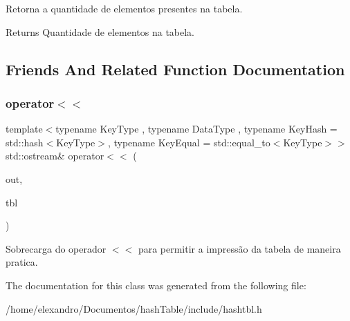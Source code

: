 Retorna a quantidade de elementos presentes na tabela. \begin{DoxyReturn}{Returns}
Quantidade de elementos na tabela. 
\end{DoxyReturn}


\subsection{Friends And Related Function Documentation}
\mbox{\label{classac_1_1_hash_tbl_aa4216a6adbf7410e7e4a66d964e223ea}} 
\subsubsection{\texorpdfstring{operator$<$$<$}{operator<<}}
{\footnotesize\ttfamily template$<$typename Key\+Type , typename Data\+Type , typename Key\+Hash  = std\+::hash$<$\+Key\+Type$>$, typename Key\+Equal  = std\+::equal\+\_\+to$<$\+Key\+Type$>$$>$ \\
std\+::ostream\& operator$<$$<$ (\begin{DoxyParamCaption}\item[{std\+::ostream \&}]{out,  }\item[{const \hyperlink{classac_1_1_hash_tbl}{Hash\+Tbl}$<$ Key\+Type, Data\+Type, \hyperlink{struct_key_hash}{Key\+Hash}, \hyperlink{struct_key_equal}{Key\+Equal} $>$ \&}]{tbl }\end{DoxyParamCaption})\hspace{0.3cm}{\ttfamily [friend]}}

Sobrecarga do operador $<$$<$ para permitir a impressão da tabela de maneira pratica. 

The documentation for this class was generated from the following file\+:\begin{DoxyCompactItemize}
\item 
/home/elexandro/\+Documentos/hash\+Table/include/hashtbl.\+h\end{DoxyCompactItemize}

